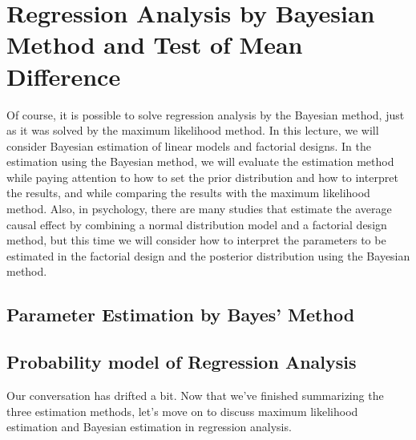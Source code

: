 \documentclass{ltjsarticle}
\begin{document}
\chapter{Regression Analysis by Bayesian Method and Test of Mean Difference}
\label{chapter26}
Of course, it is possible to solve regression analysis by the Bayesian method, just as it was solved by the maximum likelihood method. In this lecture, we will consider Bayesian estimation of linear models and factorial designs. In the estimation using the Bayesian method, we will evaluate the estimation method while paying attention to how to set the prior distribution and how to interpret the results, and while comparing the results with the maximum likelihood method. Also, in psychology, there are many studies that estimate the average causal effect by combining a normal distribution model and a factorial design method, but this time we will consider how to interpret the parameters to be estimated in the factorial design and the posterior distribution using the Bayesian method.

\section{Parameter Estimation by Bayes' Method}


\section{Probability model of Regression Analysis}
Our conversation has drifted a bit. Now that we've finished summarizing the three estimation methods, let's move on to discuss maximum likelihood estimation and Bayesian estimation in regression analysis.
\end{document}
